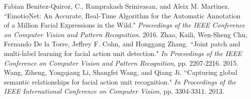 \documentclass[a4paper, 10pt, conference]{ieeeconf}      %
\begin{document}
\begin{thebibliography}{99}
Fabian Benitez-Quiroz, C., Ramprakash Srinivasan, and Aleix M. Martinez. ``EmotioNet: An Accurate, Real-Time Algorithm for the Automatic Annotation of a Million Facial Expressions in the Wild." {\it Proceedings of the IEEE Conference on Computer Vision and Pattern Recognition}. 2016.
Zhao, Kaili, Wen-Sheng Chu, Fernando De la Torre, Jeffrey F. Cohn, and Honggang Zhang. ``Joint patch and multi-label learning for facial action unit detection." {\it In Proceedings of the IEEE Conference on Computer Vision and Pattern Recognition}, pp. 2207-2216. 2015.
Wang, Ziheng, Yongqiang Li, Shangfei Wang, and Qiang Ji. ``Capturing global semantic relationships for facial action unit recognition." {\it In Proceedings of the IEEE International Conference on Computer Vision}, pp. 3304-3311. 2013.


\end{thebibliography}
\end{document}
